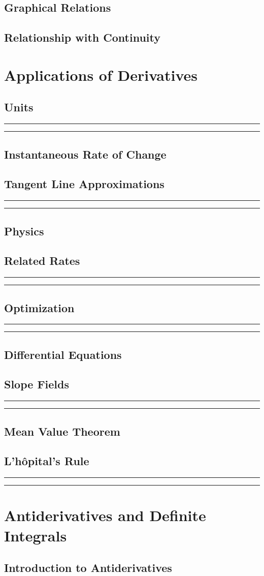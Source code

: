 \documentclass{article}
\newcommand{\newMidline}
{
	\noindent
	\rule{\textwidth}{.5pt}
}
\newcommand{\newchapter}[2]
{
	\subsection{#1}\vspace{.25in}\newMidline\newMidline\vspace{.125in}
}
\begin{document}
\subsection{Graphical Relations} 
\subsection{Relationship with Continuity} 
\newpage
\section{Applications of Derivatives}
\subsection{Units}\newMidline\newMidline
\subsection{Instantaneous Rate of Change}
\newchapter{Tangent Line Approximations}{TangentLineApproximations}
\subsection{Physics}
\newchapter{Related Rates}{DerivativeRelatedRates}
\newchapter{Optimization}{Optimization}
\subsection{Differential Equations}
\newchapter{Slope Fields}{SlopeFields}
\subsection{Mean Value Theorem}
\newchapter{L'h\^{o}pital's Rule}{LhospitalsRule}
\newpage
\section{Antiderivatives and Definite Integrals}
\subsection{Introduction to Antiderivatives}
\end{document}
